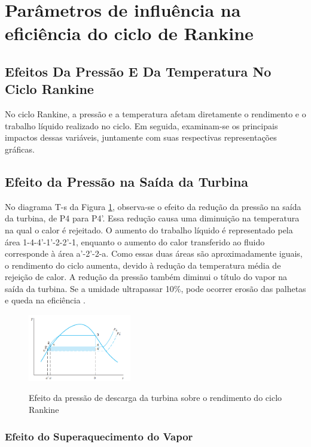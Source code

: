 \documentclass[
	article,			%
	11pt,				%
	oneside,			%
	a4paper,			%
	english,			%
	brazil,				%
	sumario=tradicional
	]{abntex2}
\begin{document}
\section{Parâmetros de influência na eficiência do ciclo de Rankine}

\subsection{Efeitos Da Pressão E Da Temperatura No Ciclo Rankine}

No ciclo Rankine, a pressão e a temperatura afetam diretamente o rendimento e o trabalho líquido realizado no ciclo. Em seguida, examinam-se os principais impactos dessas variáveis, juntamente com suas respectivas representações gráficas.

\subsection{Efeito da Pressão na Saída da Turbina}

No diagrama T-s da Figura \ref{fig:efeito-pressao}, observa-se o efeito da redução da pressão na saída da turbina, de P4 para P4'. Essa redução causa uma diminuição na temperatura na qual o calor é rejeitado. O aumento do trabalho líquido é representado pela área 1-4-4'-1'-2-2'-1, enquanto o aumento do calor transferido ao fluido corresponde à área a'-2'-2-a. Como essas duas áreas são aproximadamente iguais, o rendimento do ciclo aumenta, devido à redução da temperatura média de rejeição de calor. A redução da pressão também diminui o título do vapor na saída da turbina. Se a umidade ultrapassar 10\%, pode ocorrer erosão das palhetas e queda na eficiência \cite{borgnakke-2020}.

\begin{figure}[h]
	\centering
	\caption{Efeito da pressão de descarga da turbina sobre o rendimento do ciclo Rankine}
	\includegraphics[width=0.4\textwidth]{./images/efeito-pressao.png}
	\label{fig:efeito-pressao}
\end{figure}

\subsubsection{Efeito do Superaquecimento do Vapor}
\end{document}
